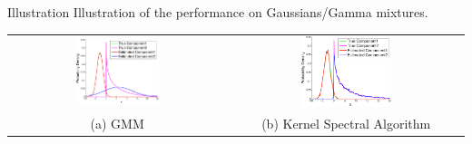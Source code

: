 \documentclass[final,t]{beamer}
\begin{document}
\begin{frame}{}
\begin{columns}[t]
\begin{column}{.3\linewidth}
    \begin{block}{Illustration}
    Illustration of the performance on Gaussians/Gamma mixtures.
    \begin{center}
        \begin{tabular}{cc}
        \includegraphics[width=0.4\textwidth]{../experiment/visualization/em_visual_k_2_view_1-crop}&
        \includegraphics[width=0.4\textwidth]{../experiment/visualization/visual_k_2_view_1-crop-crop}\\
        (a) GMM & (b) Kernel Spectral Algorithm
        \end{tabular}
    \end{center}
    \vspace{-0.45in}
    \end{block}

    \end{column}


\end{columns}
\end{frame}
\end{document}
